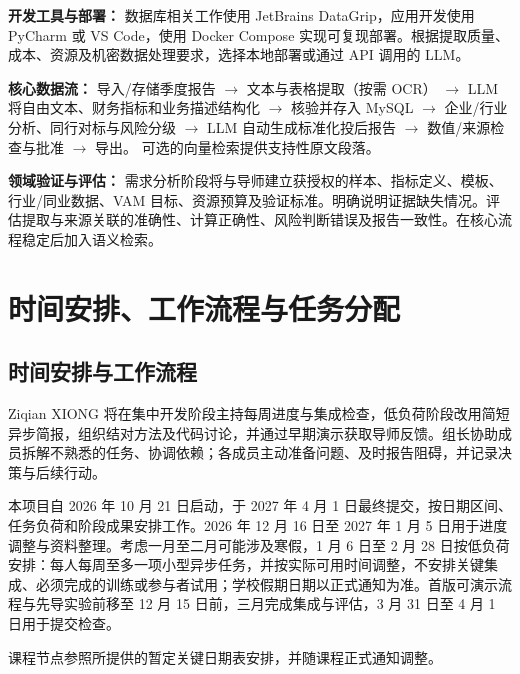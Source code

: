 \documentclass[a4paper,12pt]{article}
\begin{document}
\noindent\textbf{开发工具与部署：}
数据库相关工作使用 JetBrains DataGrip，应用开发使用 PyCharm 或 VS Code，使用 Docker Compose 实现可复现部署。根据提取质量、成本、资源及机密数据处理要求，选择本地部署或通过 API 调用的 LLM。

\medskip
\noindent\textbf{核心数据流：}
导入/存储季度报告 $\rightarrow$ 文本与表格提取（按需 OCR）
$\rightarrow$ LLM 将自由文本、财务指标和业务描述结构化
$\rightarrow$ 核验并存入 MySQL
$\rightarrow$ 企业/行业分析、同行对标与风险分级
$\rightarrow$ LLM 自动生成标准化投后报告
$\rightarrow$ 数值/来源检查与批准 $\rightarrow$ 导出。
可选的向量检索提供支持性原文段落。

\medskip
\noindent\textbf{领域验证与评估：}
需求分析阶段将与导师建立获授权的样本、指标定义、模板、行业/同业数据、VAM 目标、资源预算及验证标准。明确说明证据缺失情况。评估提取与来源关联的准确性、计算正确性、风险判断错误及报告一致性。在核心流程稳定后加入语义检索。

\newpage
\section{时间安排、工作流程与任务分配}
\subsection{时间安排与工作流程}
Ziqian XIONG 将在集中开发阶段主持每周进度与集成检查，低负荷阶段改用简短异步简报，组织结对方法及代码讨论，并通过早期演示获取导师反馈。组长协助成员拆解不熟悉的任务、协调依赖；各成员主动准备问题、及时报告阻碍，并记录决策与后续行动。

本项目自 2026 年 10 月 21 日启动，于 2027 年 4 月 1 日最终提交，按日期区间、任务负荷和阶段成果安排工作。2026 年 12 月 16 日至 2027 年 1 月 5 日用于进度调整与资料整理。考虑一月至二月可能涉及寒假，1 月 6 日至 2 月 28 日按低负荷安排：每人每周至多一项小型异步任务，并按实际可用时间调整，不安排关键集成、必须完成的训练或参与者试用；学校假期日期以正式通知为准。首版可演示流程与先导实验前移至 12 月 15 日前，三月完成集成与评估，3 月 31 日至 4 月 1 日用于提交检查。

课程节点参照所提供的暂定关键日期表安排，并随课程正式通知调整。
\end{document}
